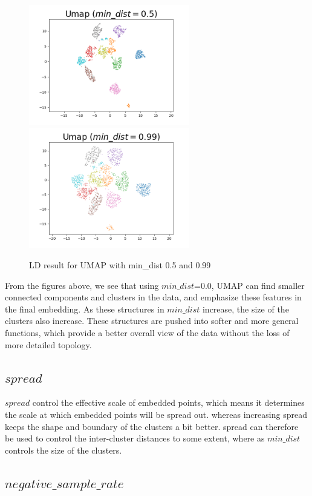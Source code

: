 \begin{figure}[H]
\centering  %
{
\label{Fig.sub.1}
\includegraphics[width=7cm,height=3.5cm\textwidth]{images/umap/umap_min_dist_0.5.png}}
{
\label{Fig.sub.2}
\includegraphics[width=7cm,height=3.5cm\textwidth]{images/umap/umap_min_dist_0.99.png}}
\caption{LD result for UMAP with min\_dist 0.5 and 0.99}
\end{figure}


\noindent From the figures above, we see that using $min\_dist$=0.0, UMAP can find smaller connected components and clusters in the data, and emphasize these features in the final embedding. As these structures in $min\_dist$ increase, the size of the clusters also increase. These structures are pushed into softer and more general functions, which provide a better overall view of the data without the loss of more detailed topology. 

\subsection{$spread$}

$spread$ control the effective scale of embedded points, which means it determines the scale at which embedded points will be spread out. whereas increasing spread keeps the shape and boundary of the clusters a bit better. spread can therefore be used to control the inter-cluster distances to some extent, where as $min\_dist$ controls the size of the clusters.

\subsection{$negative\_sample\_rate$}

